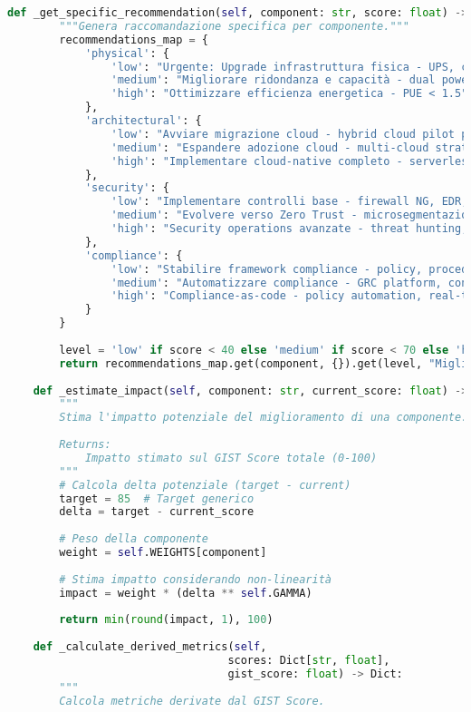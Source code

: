 \begin{lstlisting}[language=Python, caption={Implementazione completa GIST Calculator con validazione e reporting}]
    def _get_specific_recommendation(self, component: str, score: float) -> str:
        """Genera raccomandazione specifica per componente."""
        recommendations_map = {
            'physical': {
                'low': "Urgente: Upgrade infrastruttura fisica - UPS, cooling, connettività fiber",
                'medium': "Migliorare ridondanza e capacità - dual power, N+1 cooling",
                'high': "Ottimizzare efficienza energetica - PUE < 1.5"
            },
            'architectural': {
                'low': "Avviare migrazione cloud - hybrid cloud pilot per servizi non critici",
                'medium': "Espandere adozione cloud - multi-cloud strategy, containerization",
                'high': "Implementare cloud-native completo - serverless, edge computing"
            },
            'security': {
                'low': "Implementare controlli base - firewall NG, EDR, patch management",
                'medium': "Evolvere verso Zero Trust - microsegmentazione, SIEM/SOAR",
                'high': "Security operations avanzate - threat hunting, deception technology"
            },
            'compliance': {
                'low': "Stabilire framework compliance - policy, procedure, training base",
                'medium': "Automatizzare compliance - GRC platform, continuous monitoring",
                'high': "Compliance-as-code - policy automation, real-time attestation"
            }
        }
        
        level = 'low' if score < 40 else 'medium' if score < 70 else 'high'
        return recommendations_map.get(component, {}).get(level, "Miglioramento generale richiesto")
    
    def _estimate_impact(self, component: str, current_score: float) -> float:
        """
        Stima l'impatto potenziale del miglioramento di una componente.
        
        Returns:
            Impatto stimato sul GIST Score totale (0-100)
        """
        # Calcola delta potenziale (target - current)
        target = 85  # Target generico
        delta = target - current_score
        
        # Peso della componente
        weight = self.WEIGHTS[component]
        
        # Stima impatto considerando non-linearità
        impact = weight * (delta ** self.GAMMA) 
        
        return min(round(impact, 1), 100)
    
    def _calculate_derived_metrics(self, 
                                  scores: Dict[str, float],
                                  gist_score: float) -> Dict:
        """
        Calcola metriche derivate dal GIST Score.
        

\end{lstlisting}
